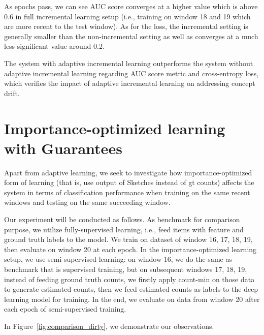 As epochs pass, we can see AUC score converges at a higher value which is above 0.6 in full incremental learning setup (i.e., training on window 18 and 19 which are more recent to the test window). As for the loss, the incremental setting is generally smaller than the non-incremental setting as well as converges at a much less significant value around 0.2.

The system with adaptive incremental learning outperforms the system without adaptive incremental learning regarding AUC score metric and cross-entropy loss, which verifies the impact of adaptive incremental learning on addressing concept drift.

\section{Importance-optimized learning with Guarantees}

Apart from adaptive learning, we seek to investigate how importance-optimized form of learning (that is, use output of Sketches instead of gt counts) affects the system in terms of classification performance when training on the same recent windows and testing on the same succeeding window.


Our experiment will be conducted as follows. As benchmark for comparison purpose, we utilize fully-supervised learning, i.e., feed items with feature and ground truth labels to the model. We train on dataset of window 16, 17, 18, 19, then evaluate on window 20 at each epoch.
In the importance-optimized learning setup, we use semi-supervised learning: on window 16, we do the same as benchmark that is supervised training, but on subsequent windows 17, 18, 19, instead of feeding ground truth counts, we firstly apply count-min on those data to generate estimated counts, then we feed estimated counts as labels to the deep learning model for training. In the end, we evaluate on data from window 20 after each epoch of semi-supervised training.


In Figure~\ref{fig:comparison_dirty}, we demonstrate our observations.

